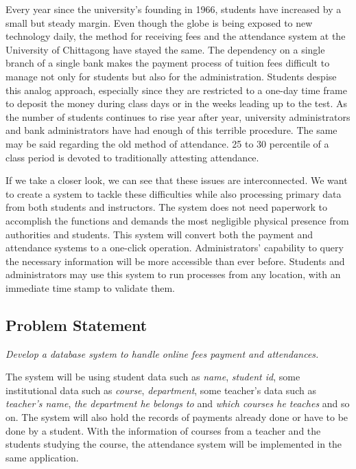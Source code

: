 Every year since the university’s founding in 1966, students have increased by a small but steady margin. Even though the globe is being exposed to new technology daily, the method for receiving fees and the attendance system at the University of Chittagong have stayed the same. The dependency on a single branch of a single bank makes the payment process of tuition fees difficult to manage not only for students but also for the administration. Students despise this analog approach, especially since they are restricted to a one-day time frame to deposit the money during class days or in the weeks leading up to the test. As the number of students continues to rise year after year, university administrators and bank administrators have had enough of this terrible procedure. The same may be said regarding the old method of attendance. 25 to 30 percentile of a class period is devoted to traditionally attesting attendance.

If we take a closer look, we can see that these issues are interconnected. We want to create a system to tackle these difficulties while also processing primary data from both students and instructors. The system does not need paperwork to accomplish the functions and demands the most negligible physical presence from authorities and students. This system will convert both the payment and attendance systems to a one-click operation. Administrators' capability to query the necessary information will be more accessible than ever before. Students and administrators may use this system to run processes from any location, with an immediate time stamp to validate them.

\subsection{Problem Statement}\label{subsec:ps} 

\emph{Develop a database system to handle online fees payment and attendances.}

The system will be using student data such as \emph{name}, \emph{student id}, some institutional data such as \emph{course}, \emph{department}, some teacher's data such as \emph{teacher's name}, \emph{the department he belongs to} and \emph{which courses he teaches} and so on. The system will also hold the records of payments already done or have to be done by a student. With the information of courses from a teacher and the students studying the course, the attendance system will be implemented in the same application.

